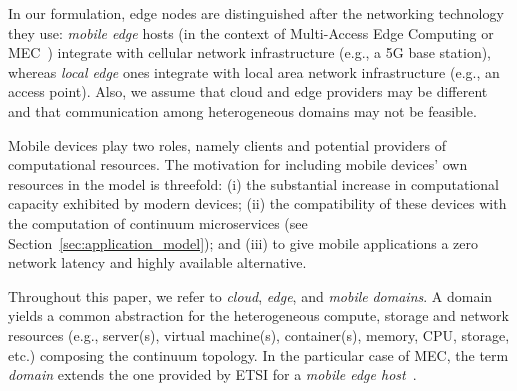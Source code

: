 %
%

In our formulation, edge nodes are distinguished after the networking technology they use: \textit{mobile edge} hosts (in the context of Multi-Access Edge Computing or MEC~\cite{etsimec16,ahmed2016isco}) integrate with cellular network infrastructure (e.g., a 5G base station), whereas \textit{local edge} ones integrate with local area network infrastructure (e.g., an access point). Also, we assume that cloud and edge providers may be different
and that communication among heterogeneous domains may not be feasible.%


Mobile devices play two roles, namely clients and potential providers of computational resources. The motivation for including mobile devices' own resources in the model is threefold: (i) the substantial increase in computational capacity exhibited by modern devices; (ii) the compatibility of these devices with the computation of continuum microservices (see Section~\ref{sec:application_model}); and (iii) to give mobile applications a zero network latency and highly available alternative.%


Throughout this paper, we refer to \textit{cloud}, \textit{edge}, and \textit{mobile} \textit{domains}. 
A domain yields a common  abstraction for the heterogeneous compute, storage and network resources (e.g., server(s), virtual machine(s), container(s), memory, CPU, storage, etc.) composing the continuum topology. In the particular case of MEC, the term \textit{domain} extends the one provided by ETSI for a \textit{mobile edge host}~\cite{etsimec16}.



